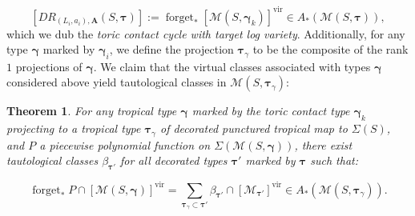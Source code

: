 \documentclass[12pt, oneside]{amsart}   	%
\newcounter{thm}
\newtheorem{theorem}[thm]{Theorem}
\newcommand{\vir}{\operatorname{vir}}
\newcommand{\forget}{\operatorname{forget}}
\numberwithin{equation}{section}
\numberwithin{thm}{section}
\numberwithin{figure}{section}
\begin{document}
\begin{equation}\label{drlogt}
[DR_{(L_i,a_i),\textbf{A}}(S,\pmb\tau)]:=\forget_*[\mathscr{M}(S,\pmb\gamma_k)]^{\vir} \in A_*(\mathscr{M}(S,\pmb\tau)),
\end{equation}
which we dub the \emph{toric contact cycle with target log variety}. Additionally, for any type $\pmb\gamma$ marked by $\pmb\gamma_i$, we define the projection $\pmb\tau_{\gamma}$ to be the composite of the rank $1$ projections of $\pmb\gamma$. We claim that the virtual classes associated with types $\pmb\gamma$ considered above yield tautological classes in $\mathscr{M}(S,\pmb\tau_{\gamma})$:


\begin{theorem}\label{hrankt}
For any tropical type $\pmb\gamma$ marked by the toric contact type $\pmb\gamma_k$ projecting to a tropical type $\pmb\tau_{\gamma}$ of decorated punctured tropical map to $\Sigma(S)$, and $P$ a piecewise polynomial function on $\Sigma(\mathscr{M}(S,\pmb\gamma))$, there exist tautological classes $\beta_{\pmb\tau'}$ for all decorated types $\pmb\tau'$ marked by $\pmb\tau$ such that:

\[\forget_*P\cap[\mathscr{M}(S,\pmb\gamma)]^{\vir} = \sum_{\pmb\tau_{\gamma}\subset \pmb\tau'} \beta_{\pmb\tau'}\cap[\mathscr{M}_{\pmb\tau'}]^{\vir} \in A_*(\mathscr{M}(S,\pmb\tau_{\gamma})).\] 
\end{theorem}
\end{document}
